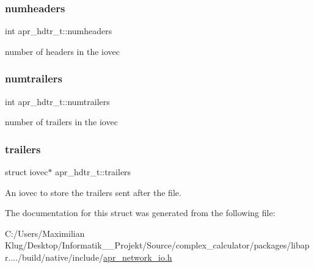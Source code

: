 \subsubsection{\texorpdfstring{numheaders}{numheaders}}
{\footnotesize\ttfamily int apr\+\_\+hdtr\+\_\+t\+::numheaders}

number of headers in the iovec \mbox{\label{structapr__hdtr__t_a9468659de891a5672b0b84cf442e9c7b}} 
\subsubsection{\texorpdfstring{numtrailers}{numtrailers}}
{\footnotesize\ttfamily int apr\+\_\+hdtr\+\_\+t\+::numtrailers}

number of trailers in the iovec \mbox{\label{structapr__hdtr__t_a538387cfa0065abc2bfa6ba7393fa3ee}} 
\subsubsection{\texorpdfstring{trailers}{trailers}}
{\footnotesize\ttfamily struct iovec$\ast$ apr\+\_\+hdtr\+\_\+t\+::trailers}

An iovec to store the trailers sent after the file. 

The documentation for this struct was generated from the following file\+:\begin{DoxyCompactItemize}
\item 
C\+:/\+Users/\+Maximilian Klug/\+Desktop/\+Informatik\+\_\+\_\+\+Projekt/\+Source/complex\+\_\+calculator/packages/libapr..../build/native/include/\mbox{\hyperlink{apr__network__io_8h}{apr\+\_\+network\+\_\+io.\+h}}\end{DoxyCompactItemize}
